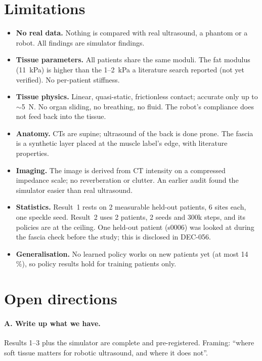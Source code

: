 \documentclass[10pt,a4paper,twocolumn]{article}
\newcommand{\dec}[1]{\textsf{#1}}
\begin{document}
\section{Limitations}
\begin{itemize}
  \item \textbf{No real data.} Nothing is compared with real ultrasound, a phantom or a robot. All findings are
    simulator findings.
  \item \textbf{Tissue parameters.} All patients share the same moduli. The fat modulus (11~kPa) is higher than the
    1--2~kPa a literature search reported (not yet verified). No per-patient stiffness.
  \item \textbf{Tissue physics.} Linear, quasi-static, frictionless contact; accurate only up to $\sim$5~N. No
    organ sliding, no breathing, no fluid. The robot's compliance does not feed back into the tissue.
  \item \textbf{Anatomy.} CTs are supine; ultrasound of the back is done prone. The fascia is a synthetic layer placed
    at the muscle label's edge, with literature properties.
  \item \textbf{Imaging.} The image is derived from CT intensity on a compressed impedance scale; no reverberation
    or clutter. An earlier audit found the simulator easier than real ultrasound.
  \item \textbf{Statistics.} Result~1 rests on 2 measurable held-out patients, 6 sites each, one speckle seed.
    Result~2 uses 2 patients, 2 seeds and 300k steps, and its policies are at the ceiling. One held-out patient
    (s0006) was looked at during the fascia check before the study; this is disclosed in \dec{DEC-056}.
  \item \textbf{Generalisation.} No learned policy works on new patients yet (at most 14\,\%), so policy results hold
    for training patients only.
\end{itemize}

\section{Open directions}
\label{sec:open}

\paragraph{A. Write up what we have.} Results 1--3 plus the simulator are complete and pre-registered. Framing:
``where soft tissue matters for robotic ultrasound, and where it does not''.
\end{document}
